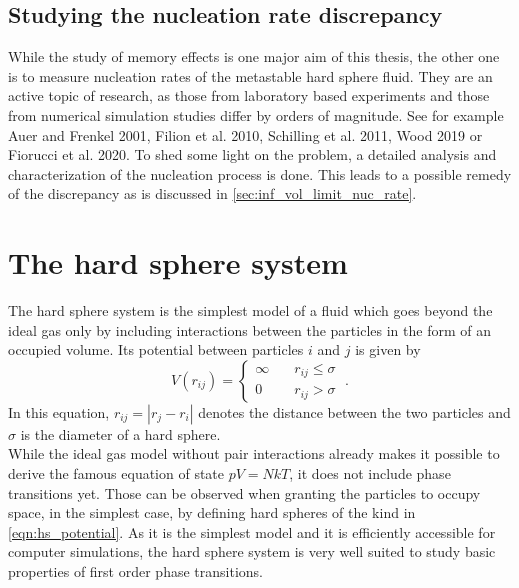 \subsection{Studying the nucleation rate discrepancy}
While the study of memory effects is one major aim of this thesis, the other one is to measure nucleation rates of the metastable hard sphere fluid. They are an active topic of research, as those from laboratory based experiments and those from numerical simulation studies differ by orders of magnitude. See for example Auer and Frenkel 2001\cite{Auer2001}, Filion et al. 2010\cite{Filion2010a}, Schilling et al. 2011\cite{Schilling2011}, Wood 2019\cite{Wood2019} or Fiorucci et al. 2020\cite{Fiorucci2020a}. To shed some light on the problem, a detailed analysis and characterization of the nucleation process is done. This leads to a possible remedy of the discrepancy as is discussed in \autoref{sec:inf_vol_limit_nuc_rate}.
\newpage

\section{The hard sphere system}
\label{sec:HS_system}
The hard sphere system is the simplest model of a fluid which goes beyond the ideal gas only by including interactions between the particles in the form of an occupied volume. Its potential between particles $i$ and $j$ is given by
\begin{equation}
\label{eqn:hs_potential}
V(r_{ij})=%
\begin{cases}
\infty \quad & r_{ij} \le \sigma \\
0 \quad & r_{ij} > \sigma
\end{cases} \; \text{.}
\end{equation}
In this equation, $r_{ij} = |r_j - r_i|$ denotes the distance between the two particles and $\sigma$ is the diameter of a hard sphere.\\

While the ideal gas model without pair interactions already makes it possible to derive the famous equation of state $pV=NkT$, it does not include phase transitions yet. Those can be observed when granting the particles to occupy space, in the simplest case, by defining hard spheres of the kind in \autoref{eqn:hs_potential}. As it is the simplest model and it is efficiently accessible for computer simulations, the hard sphere system is very well suited to study basic properties of first order phase transitions.\\ 

